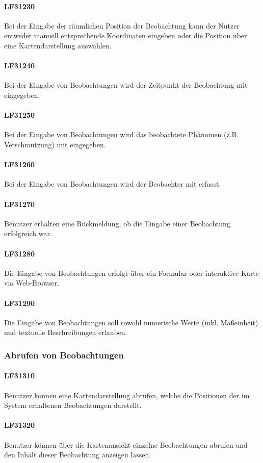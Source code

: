 \documentclass[a4paper,11pt]{scrartcl}
\begin{document}
			\paragraph{LF31230}
				Bei der Eingabe der räumlichen Position der Beobachtung kann der Nutzer entweder manuell entsprechende Koordinaten eingeben oder die Position über eine Kartendarstellung auswählen.		
			\paragraph{LF31240}
				Bei der Eingabe von Beobachtungen wird der Zeitpunkt der Beobachtung mit eingegeben.			
			\paragraph{LF31250}
				Bei der Eingabe von Beobachtungen wird das beobachtete Phänomen (z.B. Verschmutzung) mit eingegeben.
			\paragraph{LF31260}
				Bei der Eingabe von Beobachtungen wird der Beobachter mit erfasst.
			\paragraph{LF31270}
				Benutzer erhalten eine Rückmeldung, ob die Eingabe einer Beobachtung erfolgreich war.
			\paragraph{LF31280}
				Die Eingabe von Beobachtungen erfolgt über ein Formular oder interaktive Karte via Web-Browser.
			\paragraph{LF31290}
				Die Eingabe von Beobachtungen soll sowohl numerische Werte (inkl. Maßeinheit) und textuelle Beschreibungen erlauben.
		\subsubsection{Abrufen von Beobachtungen}
			\paragraph{LF31310}
				Benutzer können eine Kartendarstellung abrufen, welche die Positionen der im System erhaltenen Beobachtungen darstellt.
			\paragraph{LF31320}
				Benutzer können über die Kartenansicht einzelne Beobachtungen abrufen und den Inhalt dieser Beobachtung anzeigen lassen.
\end{document}
